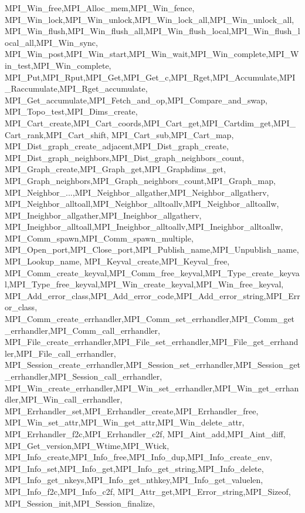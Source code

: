 {{{{{    MPI_Win_free,MPI_Alloc_mem,MPI_Win_fence,
    MPI_Win_lock,MPI_Win_unlock,MPI_Win_lock_all,MPI_Win_unlock_all,
    MPI_Win_flush,MPI_Win_flush_all,MPI_Win_flush_local,MPI_Win_flush_local_all,MPI_Win_sync,
    MPI_Win_post,MPI_Win_start,MPI_Win_wait,MPI_Win_complete,MPI_Win_test,MPI_Win_complete,
    MPI_Put,MPI_Rput,MPI_Get,MPI_Get_c,MPI_Rget,MPI_Accumulate,MPI_Raccumulate,MPI_Rget_accumulate,
    MPI_Get_accumulate,MPI_Fetch_and_op,MPI_Compare_and_swap,
    MPI_Topo_test,MPI_Dims_create,
    MPI_Cart_create,MPI_Cart_coords,MPI_Cart_get,MPI_Cartdim_get,MPI_Cart_rank,MPI_Cart_shift,
    MPI_Cart_sub,MPI_Cart_map,
    MPI_Dist_graph_create_adjacent,MPI_Dist_graph_create,
    MPI_Dist_graph_neighbors,MPI_Dist_graph_neighbors_count,
    MPI_Graph_create,MPI_Graph_get,MPI_Graphdims_get,
    MPI_Graph_neighbors,MPI_Graph_neighbors_count,MPI_Graph_map,
    MPI_Neighbor_...,MPI_Neighbor_allgather,MPI_Neighbor_allgatherv,
    MPI_Neighbor_alltoall,MPI_Neighbor_alltoallv,MPI_Neighbor_alltoallw,
    MPI_Ineighbor_allgather,MPI_Ineighbor_allgatherv,
    MPI_Ineighbor_alltoall,MPI_Ineighbor_alltoallv,MPI_Ineighbor_alltoallw,
    MPI_Comm_spawn,MPI_Comm_spawn_multiple,
    MPI_Open_port,MPI_Close_port,MPI_Publish_name,MPI_Unpublish_name,MPI_Lookup_name,
    MPI_Keyval_create,MPI_Keyval_free,
    MPI_Comm_create_keyval,MPI_Comm_free_keyval,MPI_Type_create_keyval,MPI_Type_free_keyval,MPI_Win_create_keyval,MPI_Win_free_keyval,
    MPI_Add_error_class,MPI_Add_error_code,MPI_Add_error_string,MPI_Error_class,
    MPI_Comm_create_errhandler,MPI_Comm_set_errhandler,MPI_Comm_get_errhandler,MPI_Comm_call_errhandler,
    MPI_File_create_errhandler,MPI_File_set_errhandler,MPI_File_get_errhandler,MPI_File_call_errhandler,
    MPI_Session_create_errhandler,MPI_Session_set_errhandler,MPI_Session_get_errhandler,MPI_Session_call_errhandler,
    MPI_Win_create_errhandler,MPI_Win_set_errhandler,MPI_Win_get_errhandler,MPI_Win_call_errhandler,
    MPI_Errhandler_set,MPI_Errhandler_create,MPI_Errhandler_free,
    MPI_Win_set_attr,MPI_Win_get_attr,MPI_Win_delete_attr,
    MPI_Errhandler_f2c,MPI_Errhandler_c2f,
    MPI_Aint_add,MPI_Aint_diff,
    MPI_Get_version,MPI_Wtime,MPI_Wtick,
    MPI_Info_create,MPI_Info_free,MPI_Info_dup,MPI_Info_create_env,
    MPI_Info_set,MPI_Info_get,MPI_Info_get_string,MPI_Info_delete,
    MPI_Info_get_nkeys,MPI_Info_get_nthkey,MPI_Info_get_valuelen,
    MPI_Info_f2c,MPI_Info_c2f,
    MPI_Attr_get,MPI_Error_string,MPI_Sizeof,
    MPI_Session_init,MPI_Session_finalize,
}}}}}
